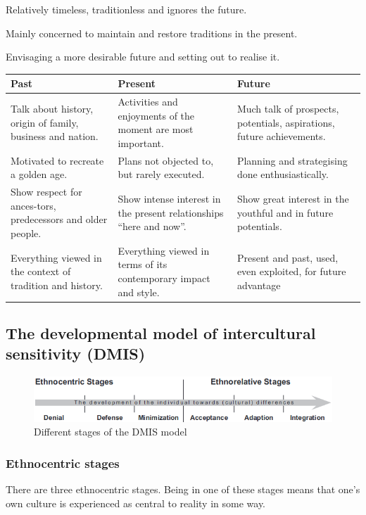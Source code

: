 \begin{description}
	\tightlist
	\item[present-oriented] Relatively timeless, traditionless and ignores the future.
	\item[past-oriented] Mainly concerned to maintain and restore traditions in the present.
	\item[future-oriented] Envisaging a more desirable future and setting out to realise it.
\end{description}

\begin{tabularx}{\textwidth}{X|X|X}
	Past & Present & Future \\ 
	\hline 
	Talk about history, origin of family, business and nation. & Activities and enjoyments of the moment are most important. & Much talk of prospects, potentials, aspirations, future achievements.\\
	Motivated to recreate a golden age. & Plans not objected to, but rarely executed. & Planning and strategising done enthusiastically. \\ 
	Show respect for ances-tors, predecessors and older people. & Show intense interest in the present relationships “here and now”. & Show great interest in the youthful and in future potentials. \\
	Everything viewed in the context of tradition and history. & Everything viewed in terms of its contemporary impact and style. & Present and past, used, even exploited, for future advantage \\
\end{tabularx}

\subsection{The developmental model of intercultural sensitivity (DMIS)}
\begin{figure}[H]
	\centering
	\includegraphics[width=\textwidth]{figures/DMISmodel.png}
	\caption{Different stages of the DMIS model}
\end{figure}

\subsubsection{Ethnocentric stages}
There are three ethnocentric stages. Being in one of these stages means that one’s own culture is experienced as central to reality in some way.

